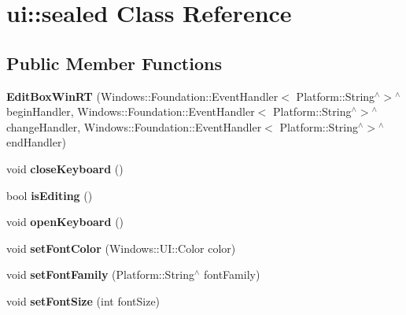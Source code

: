 \hypertarget{classui_1_1sealed}{}\section{ui\+:\+:sealed Class Reference}
\label{classui_1_1sealed}
\subsection*{Public Member Functions}
\begin{DoxyCompactItemize}
\item 
\mbox{\label{classui_1_1sealed_aec180f2d809ea5a0513fc9050cdea7ec}} 
{\bfseries Edit\+Box\+Win\+RT} (Windows\+::\+Foundation\+::\+Event\+Handler$<$ Platform\+::\+String$^\wedge$$>$$^\wedge$ begin\+Handler, Windows\+::\+Foundation\+::\+Event\+Handler$<$ Platform\+::\+String$^\wedge$$>$$^\wedge$ change\+Handler, Windows\+::\+Foundation\+::\+Event\+Handler$<$ Platform\+::\+String$^\wedge$$>$$^\wedge$ end\+Handler)
\item 
\mbox{\label{classui_1_1sealed_a39a9a1a6ae83b06c85de7fd432e3be6a}} 
void {\bfseries close\+Keyboard} ()
\item 
\mbox{\label{classui_1_1sealed_ade59666643f0ae12344dbf881bdf6d38}} 
bool {\bfseries is\+Editing} ()
\item 
\mbox{\label{classui_1_1sealed_a4990f6f13639267e1a6212e9a56949ae}} 
void {\bfseries open\+Keyboard} ()
\item 
\mbox{\label{classui_1_1sealed_a684b3edd342648a25e44495cc0acf5d8}} 
void {\bfseries set\+Font\+Color} (Windows\+::\+U\+I\+::\+Color color)
\item 
\mbox{\label{classui_1_1sealed_a682bbd4fb4835cdb29e353d07e9b85d6}} 
void {\bfseries set\+Font\+Family} (Platform\+::\+String$^\wedge$ font\+Family)
\item 
\mbox{\label{classui_1_1sealed_ad2dc50c04821b025515be9259b81da4a}} 
void {\bfseries set\+Font\+Size} (int font\+Size)
\item 
\mbox{\label{classui_1_1sealed_a19fd1b58a8bc758fa8d3b9ceecad6db9}} 

\end{DoxyCompactItemize}
